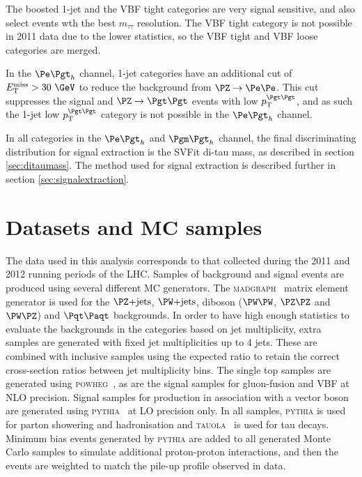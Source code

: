The boosted 1-jet and the VBF tight categories are very 
signal sensitive, and also select events wth the best $m_{\tau\tau}$ resolution.
The VBF tight category is not possible in 2011 data due to the lower statistics,
so the VBF tight and VBF loose categories are merged. 

In the $\etau$ channel, 1-jet categories have an additional cut of $\MET >
30~\GeV$ to reduce the background from $\PZ\to\Pe\Pe$. This cut suppresses the
signal and $\ZToTauTau$ events with low $\pt^{\Pgt\Pgt}$, and as such the 1-jet low
$\pt^{\Pgt\Pgt}$ category is not possible in the $\etau$ channel. 

In all categories in the $\etau$ and $\mutau$ channel, the final discriminating
distribution for signal extraction is the SVFit di-tau mass, as described in
section \ref{sec:ditaumass}. The method used for signal extraction is described
further in section \ref{sec:signalextraction}.

\section{Datasets and \ac{MC} samples}
\label{sec:dataandMC}

The data used in this analysis corresponds to that collected during the 2011 and
2012 running periods of the \ac{LHC}. Samples of background and signal events are produced using several different
\ac{MC} generators. The \textsc{madgraph}~\cite{Alwall:2011uj} matrix element
generator is used for the $\ZJets$, $\WJets$, diboson ($\PW\PW$, $\PZ\PZ$ and
$\PW\PZ$) and $\ttbar$ backgrounds. 
In order to have high enough statistics to evaluate the
backgrounds in the categories based on jet multiplicity, extra samples are
generated with fixed jet multiplicities up to 4 jets. These are combined with
inclusive samples using the expected ratio to retain the correct cross-section
ratios between jet multiplicity bins. The single top samples are generated using
\textsc{powheg}~\cite{Frixione:2007vw,Alioli:2010xd,Alioli:2010xa}, as are the
signal samples for gluon-fusion and \ac{VBF} at \ac{NLO} precision. Signal
samples for production in association with a vector boson are generated using
\textsc{pythia}~\cite{Sjostrand:2006za} at \ac{LO} precision only. In all
samples, \textsc{pythia} is used for parton showering and hadronisation and
\textsc{tauola}~\cite{TAUOLA} is used for tau decays. Minimum bias events
generated by \textsc{pythia} are added to all generated Monte Carlo samples
to simulate additional proton-proton interactions, and then the events are
weighted to match the pile-up profile observed in data. 

